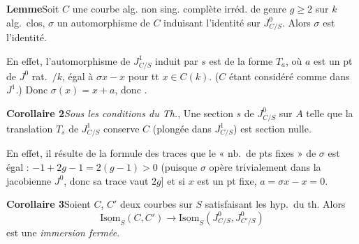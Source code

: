 \documentclass[11pt,a4paper]{article}
\begin{document}

\textbf{Lemme}\quad Soit $C$ une courbe alg. non sing. complète
 irréd. de genre $g \geq 2$ sur $k$ alg.\ clos, $\sigma$ un
automorphisme de $C$ induisant l'identité sur $J^{0}_{C/S}$. Alors $\sigma$
est l'identité.

En effet, l'automorphisme de $J^{1}_{C/S}$ induit par $s$ est de la forme
$T_{a}$, où $a$ est un pt de $J^{0}$ rat.\ $/k$, égal à $\sigma x - x$ pour tt
$x \in C(k)$. ($C$ étant considéré comme  dans $J^{1}$.) Donc
$\sigma(x) = x + a$, donc \ill{} \ill{}  \ill{}
.

\textbf{Corollaire 2}\quad \emph{Sous les conditions du Th.}, 
Une section $s$ de $J^{0}_{C/S}$ sur $A$ telle que la translation $T_{s}$ de $J^{1}_{C/S}$ conserve $C$
(plongée dans $J^{1}_{C/S}$) est  section
nulle.

En effet, il résulte de la formule des traces que le « nb.\ de pts fixes » de
$\sigma$ est égal : $-1 + 2g - 1 = 2(g-1) > 0$  (puisque $\sigma$ opère trivialement dans la jacobienne $J^{0}$, donc sa
trace vaut $2g$] et si $x$ est un pt fixe, \ill{} $a = \sigma x - x = 0$.






\textbf{Corollaire 3}\quad Soient $C$, $C'$ deux courbes sur $S$ satisfaisant
les hyp.\ du th. Alors
\[
  \underline{\mathrm{Isom}}_{S}(C, C') \longrightarrow
  \underline{\mathrm{Isom}}_{S}(J^{0}_{C/S}, J^{0}_{C'/S})
\]
est une \emph{immersion fermée}.
\end{document}
